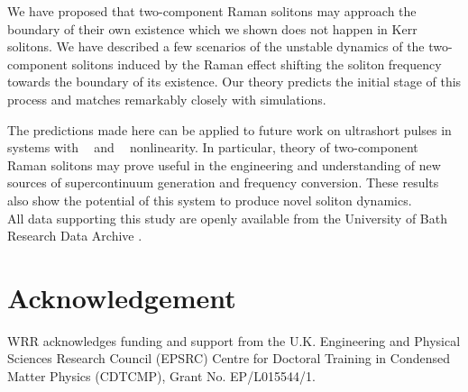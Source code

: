 \documentclass[reprint,
 amsmath,amssymb,
 pra,
]{revtex4-1}
\DeclareMathOperator{\chitwo}{ {\chi}^{(2)} }
\DeclareMathOperator{\chithree}{ {\chi}^{(3)} }
\begin{document}
We have proposed that two-component Raman solitons may approach the boundary of their own existence which we shown does not happen in Kerr solitons. We have described a few scenarios of the unstable dynamics of the two-component solitons induced by the Raman effect shifting the soliton frequency  towards the boundary of its existence. Our theory predicts the initial stage of this process and matches remarkably closely with simulations. 

The predictions made here can be applied to future work on ultrashort pulses in systems with $\chitwo$ and $\chithree$ nonlinearity. In particular, theory of two-component Raman solitons may prove useful in the engineering and understanding of new sources of supercontinuum generation and frequency conversion. These results also show the potential of this system to produce novel soliton dynamics.
\\

All data supporting this study are openly available from the University of Bath Research Data Archive \cite{RoweDatasetHttps://doi.org/10.15125/BATH-00808}.

\section{Acknowledgement}
WRR acknowledges funding and support from the U.K. Engineering and Physical Sciences Research Council (EPSRC) Centre for Doctoral Training in Condensed Matter Physics (CDTCMP), Grant No. EP/L015544/1.




\end{document}
